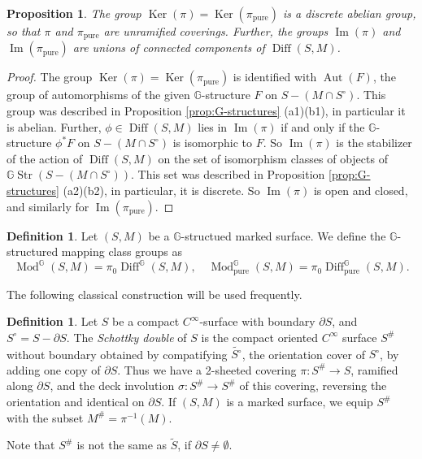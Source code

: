 \documentclass[english,11pt,leqno]{article}
\def\GG{\mathbb{G}}
\def\Aut{\operatorname{Aut}\nolimits}
\def\Ker{\operatorname{Ker}\nolimits}
\def\Mod{\operatorname{Mod}}
\def\on{\operatorname}
\def\pure{{\on{pure}}}
\def\Gstr{\GG\on{Str}}
\def\Diff{\on{Diff}}
\newtheorem{prop}[thm]{Proposition}
\theoremstyle{definition}
\newtheorem{defi}[thm]{Definition}
\theoremstyle{remark}
\numberwithin{equation}{section}
\begin{document}
\begin{prop}\label{prop:str-non-str-diff}
The group $\Ker(\pi)=\Ker(\pi_\pure)$ is a discrete abelian group, so that $\pi$ and $\pi_\pure$ are
unramified coverings. Further, the groups $\on{Im}(\pi)$ and $\on{Im}(\pi_\pure)$ are 
unions of connected components of $\Diff(S,M)$. 
\end{prop}

\begin{proof} The group $\Ker(\pi)=\Ker(\pi_\pure)$ is identified with $\Aut(F)$, the group
of automorphisms of the given $\GG$-structure $F$ on $S-(M\cap S^\circ)$. This group was described
in Proposition \ref {prop:G-structures} (a1)(b1), in particular it is abelian. Further, $\phi\in\Diff(S,M)$ lies
in $\on{Im}(\pi)$ if and only if the $\GG$-structure $\phi^*F$  on $S-(M\cap S^\circ)$  is isomorphic to $F$. So 
$\on{Im}(\pi)$ is the stabilizer of the action of $\Diff(S,M)$ on the  set of
isomorphism classes of objects of $\Gstr(S-(M\cap S^\circ))$. This set was described in Proposition 
 \ref {prop:G-structures}  (a2)(b2), in particular, it is discrete. So $\on{Im}(\pi)$ is open and
 closed, and similarly for $\on{Im}(\pi_\pure)$. 
\end{proof}
 
\begin{defi}
 Let $(S,M)$ be a $\GG$-structued marked surface. We define the $\GG$-structured mapping class
 groups as
 \[
 	\Mod^\GG(S,M) = \pi_0 \Diff^\GG(S,M), \quad  \Mod^\GG_\pure(S,M) =\pi_0 \Diff_\pure^\GG(S,M). 
 \]
\end{defi}

The following classical construction will be used frequently.

\begin{defi}
Let $S$ be a compact $C^\infty$-surface with boundary $\partial S$, and $S^\circ = S-\partial S$. 
The {\em Schottky double} of $S$ is the compact oriented $C^\infty$ surface $S^\#$
without boundary obtained by compatifying $\widetilde{S^\circ}$, the orientation cover of $S^\circ$,
by adding one copy of $\partial S$. Thus we have a 2-sheeted covering $\pi: S^\#\to S$, ramified
along $\partial S$, and the deck involution $\sigma: S^\#\to S^\#$ of this covering, reversing the
orientation and identical on  $\partial S$. If $(S,M)$ is a marked surface, we equip $S^\#$ with the
subset $M^\#=\pi^{-1}(M)$. 
\end{defi}

Note that $S^\#$ is not the same as $\widetilde S$, if $\partial S\neq\emptyset$. 
\end{document}

